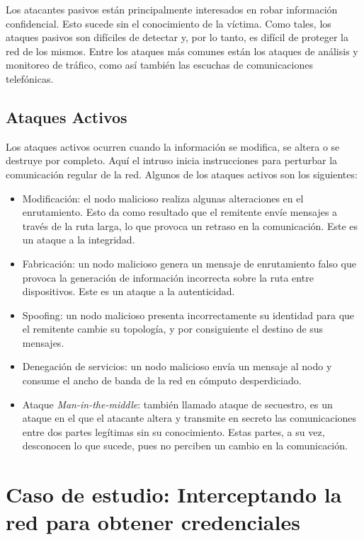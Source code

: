 Los atacantes pasivos están principalmente interesados en robar información 
confidencial. Esto sucede sin el conocimiento de la víctima. Como tales, 
los ataques pasivos son difíciles de detectar y, por lo tanto, es difícil de
proteger la red de los mismos. Entre los ataques más comunes están los 
ataques de análisis y monitoreo de tráfico, como así también las 
escuchas de comunicaciones telefónicas.

\subsection{Ataques Activos}
Los ataques activos ocurren cuando la información se modifica, se altera o 
se destruye por completo. Aquí el intruso inicia instrucciones para 
perturbar la comunicación regular de la red. Algunos de los ataques 
activos son los  siguientes:
\begin{itemize}
    \setlength\itemsep{-0.6em}
    \item Modificación: el nodo malicioso realiza algunas alteraciones en el
    enrutamiento. Esto da como resultado que el remitente envíe mensajes a 
    través de la ruta larga, lo que provoca un retraso en la comunicación. 
    Este es un ataque a la integridad.
    \item Fabricación: un nodo malicioso genera un mensaje de enrutamiento 
    falso que provoca la generación de información incorrecta sobre la ruta 
    entre dispositivos. Este es un ataque a la autenticidad.
    \item Spoofing: un nodo malicioso presenta incorrectamente su identidad 
    para que el remitente cambie su topología, y por consiguiente el 
    destino de sus mensajes.
    \item Denegación de servicios: un nodo malicioso envía un mensaje al 
    nodo y consume el ancho de banda de la red en cómputo desperdiciado.
    \item Ataque \emph{Man-in-the-middle}: también llamado ataque de secuestro, 
    es un ataque en el que el atacante altera y transmite en secreto 
    las comunicaciones entre dos partes legítimas sin su conocimiento. 
    Estas partes, a su vez, desconocen lo que sucede, pues no perciben 
    un cambio en la comunicación.
\end{itemize}


\section[Caso de estudio con Kali Linux]{Caso de estudio: Interceptando la red para obtener credenciales}
\label{secCaseOfStudy}


